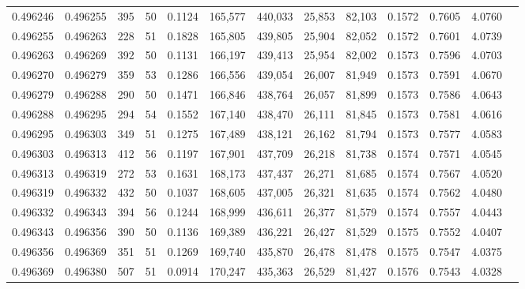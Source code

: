 \begin{tabular}{rrrrrrrrrrrrr}
0.496246 & 0.496255 & 395 &  50 &                                     0.1124 & 165,577 & 440,033 &  25,853 &  82,103 & 0.1572 & 0.7605 & 4.0760 \\
0.496255 & 0.496263 & 228 &  51 &                                     0.1828 & 165,805 & 439,805 &  25,904 &  82,052 & 0.1572 & 0.7601 & 4.0739 \\
0.496263 & 0.496269 & 392 &  50 &                                     0.1131 & 166,197 & 439,413 &  25,954 &  82,002 & 0.1573 & 0.7596 & 4.0703 \\
0.496270 & 0.496279 & 359 &  53 &                                     0.1286 & 166,556 & 439,054 &  26,007 &  81,949 & 0.1573 & 0.7591 & 4.0670 \\
0.496279 & 0.496288 & 290 &  50 &                                     0.1471 & 166,846 & 438,764 &  26,057 &  81,899 & 0.1573 & 0.7586 & 4.0643 \\
0.496288 & 0.496295 & 294 &  54 &                                     0.1552 & 167,140 & 438,470 &  26,111 &  81,845 & 0.1573 & 0.7581 & 4.0616 \\
0.496295 & 0.496303 & 349 &  51 &                                     0.1275 & 167,489 & 438,121 &  26,162 &  81,794 & 0.1573 & 0.7577 & 4.0583 \\
0.496303 & 0.496313 & 412 &  56 &                                     0.1197 & 167,901 & 437,709 &  26,218 &  81,738 & 0.1574 & 0.7571 & 4.0545 \\
0.496313 & 0.496319 & 272 &  53 &                                     0.1631 & 168,173 & 437,437 &  26,271 &  81,685 & 0.1574 & 0.7567 & 4.0520 \\
0.496319 & 0.496332 & 432 &  50 &                                     0.1037 & 168,605 & 437,005 &  26,321 &  81,635 & 0.1574 & 0.7562 & 4.0480 \\
0.496332 & 0.496343 & 394 &  56 &                                     0.1244 & 168,999 & 436,611 &  26,377 &  81,579 & 0.1574 & 0.7557 & 4.0443 \\
0.496343 & 0.496356 & 390 &  50 &                                     0.1136 & 169,389 & 436,221 &  26,427 &  81,529 & 0.1575 & 0.7552 & 4.0407 \\
0.496356 & 0.496369 & 351 &  51 &                                     0.1269 & 169,740 & 435,870 &  26,478 &  81,478 & 0.1575 & 0.7547 & 4.0375 \\
0.496369 & 0.496380 & 507 &  51 &                                     0.0914 & 170,247 & 435,363 &  26,529 &  81,427 & 0.1576 & 0.7543 & 4.0328 \\

\end{tabular}
